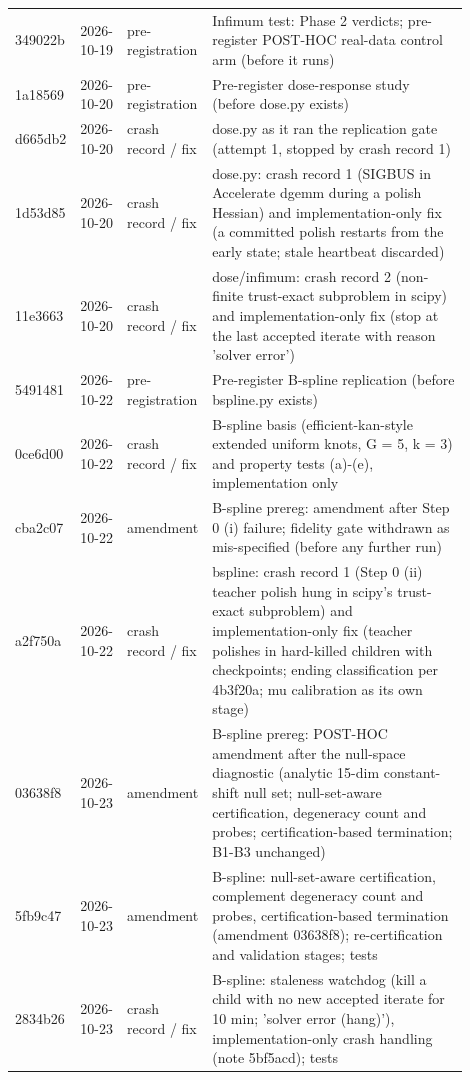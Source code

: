 {\begin{longtable}{R{0.08\linewidth} R{0.10\linewidth} R{0.14\linewidth} R{0.58\linewidth}}
349022b & 2026-10-19 & pre-registration & Infimum test: Phase 2 verdicts; pre-register POST-HOC real-data control arm (before it runs) \\
1a18569 & 2026-10-20 & pre-registration & Pre-register dose-response study (before dose.py exists) \\
d665db2 & 2026-10-20 & crash record / fix & dose.py as it ran the replication gate (attempt 1, stopped by crash record 1) \\
1d53d85 & 2026-10-20 & crash record / fix & dose.py: crash record 1 (SIGBUS in Accelerate dgemm during a polish Hessian) and implementation-only fix (a committed polish restarts from the early state; stale heartbeat discarded) \\
11e3663 & 2026-10-20 & crash record / fix & dose/infimum: crash record 2 (non-finite trust-exact subproblem in scipy) and implementation-only fix (stop at the last accepted iterate with reason 'solver error') \\
5491481 & 2026-10-22 & pre-registration & Pre-register B-spline replication (before bspline.py exists) \\
0ce6d00 & 2026-10-22 & crash record / fix & B-spline basis (efficient-kan-style extended uniform knots, G = 5, k = 3) and property tests (a)-(e), implementation only \\
cba2c07 & 2026-10-22 & amendment & B-spline prereg: amendment after Step 0 (i) failure; fidelity gate withdrawn as mis-specified (before any further run) \\
a2f750a & 2026-10-22 & crash record / fix & bspline: crash record 1 (Step 0 (ii) teacher polish hung in scipy's trust-exact subproblem) and implementation-only fix (teacher polishes in hard-killed children with checkpoints; ending classification per 4b3f20a; mu calibration as its own stage) \\
03638f8 & 2026-10-23 & amendment & B-spline prereg: POST-HOC amendment after the null-space diagnostic (analytic 15-dim constant-shift null set; null-set-aware certification, degeneracy count and probes; certification-based termination; B1-B3 unchanged) \\
5fb9c47 & 2026-10-23 & amendment & B-spline: null-set-aware certification, complement degeneracy count and probes, certification-based termination (amendment 03638f8); re-certification and validation stages; tests \\
2834b26 & 2026-10-23 & crash record / fix & B-spline: staleness watchdog (kill a child with no new accepted iterate for 10 min; 'solver error (hang)'), implementation-only crash handling (note 5bf5acd); tests \\

\end{longtable}}
